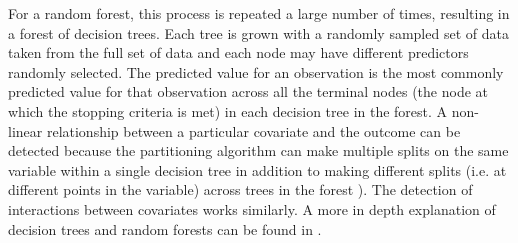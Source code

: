 \documentclass[11pt]{article}
\begin{document}
For a random forest, this process is repeated a large number of times, resulting in a forest of decision trees. Each tree is grown with a randomly sampled set of data taken from the full set of data and each node may have different predictors randomly selected. The predicted value for an observation is the most commonly predicted value for that observation across all the terminal nodes (the node at which the stopping criteria is met) in each decision tree in the forest.
A non-linear relationship between a particular covariate and the outcome can be detected because the partitioning algorithm can make multiple splits on the same variable within a single decision tree in addition to making different splits (i.e. at different points in the variable) across trees in the forest \citep[See ][]{biau2008consistency}). The detection of interactions between covariates works similarly. A more in depth explanation of decision trees and random forests can be found in \citet{strobl2009introduction}.
\end{document}
